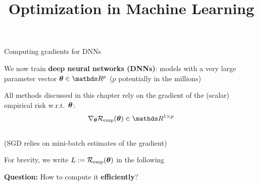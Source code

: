 \documentclass[11pt,compress,t,notes=noshow, xcolor=table]{beamer}
\title{Optimization in Machine Learning}
\begin{document}





\begin{framei}{Computing gradients for DNNs}
\item We now train \textbf{deep neural networks (DNNs)}: models with a very large parameter vector $\thetav \in \R^{p}$ ($p$ potentially in the millions)
\item All methods discussed in this chapter rely on the gradient of the (scalar) empirical risk w.r.t.\ $\bm{\theta}$: 
$$
\nabla_{\thetav} \risket \in \R^{1 \times p}
$$
\\ {\footnotesize(SGD relies on mini-batch estimates of the gradient)}

\item For brevity, we write $L := \mathcal{R}_{\text{emp}}(\bm{\theta})$ in the following
\spacer
\item \textbf{Question:} How to compute it \textbf{efficiently}?
\end{framei}


\end{document}
